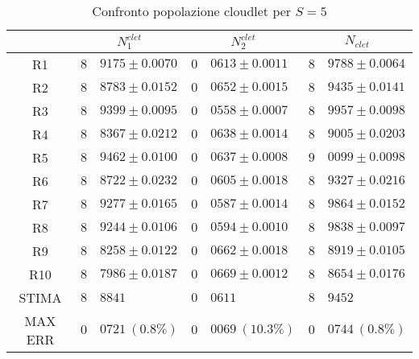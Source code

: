 \begin{table}[!h]
\begin{tabular}{c|r@{.}l|r@{.}l|r@{.}l}
& \multicolumn{2}{|c|}{$N_1^{clet}$}
& \multicolumn{2}{|c|}{$N_2^{clet}$}
& \multicolumn{2}{|c}{$N_{clet}$} 
\\          
\hline
R1      & $8$&$9175 \pm 0.0070$ & $0$&$0613 \pm 0.0011$ & $8$&$9788 \pm 0.0064$ \\
R2      & $8$&$8783 \pm 0.0152$ & $0$&$0652 \pm 0.0015$ & $8$&$9435 \pm 0.0141$ \\
R3      & $8$&$9399 \pm 0.0095$ & $0$&$0558 \pm 0.0007$ & $8$&$9957 \pm 0.0098$ \\
R4      & $8$&$8367 \pm 0.0212$ & $0$&$0638 \pm 0.0014$ & $8$&$9005 \pm 0.0203$ \\
R5      & $8$&$9462 \pm 0.0100$ & $0$&$0637 \pm 0.0008$ & $9$&$0099 \pm 0.0098$ \\
R6      & $8$&$8722 \pm 0.0232$ & $0$&$0605 \pm 0.0018$ & $8$&$9327 \pm 0.0216$ \\
R7      & $8$&$9277 \pm 0.0165$ & $0$&$0587 \pm 0.0014$ & $8$&$9864 \pm 0.0152$ \\
R8      & $8$&$9244 \pm 0.0106$ & $0$&$0594 \pm 0.0010$ & $8$&$9838 \pm 0.0097$ \\
R9      & $8$&$8258 \pm 0.0122$ & $0$&$0662 \pm 0.0018$ & $8$&$8919 \pm 0.0105$ \\
R10     & $8$&$7986 \pm 0.0187$ & $0$&$0669 \pm 0.0012$ & $8$&$8654 \pm 0.0176$ \\
STIMA   & $8$&$8841$            & $0$&$0611$            & $8$&$9452$            \\
MAX ERR & $0$&$0721 \ (0.8\%)$  & $0$&$0069 \ (10.3\%)$ & $0$&$0744 \ (0.8\%)$    
\end{tabular}
\centering
\caption{Confronto popolazione cloudlet per $S=5$}
\label{tab:5_nclet}
\end{table}
